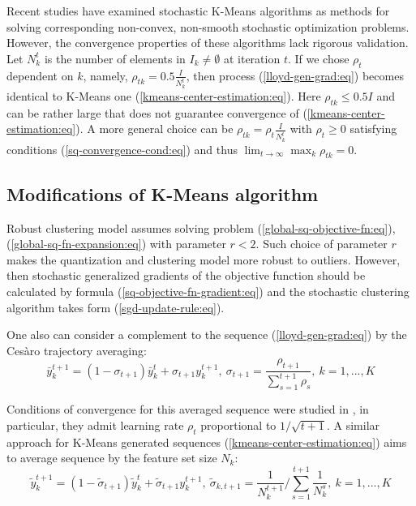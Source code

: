 Recent studies \cite{Tang_2017,Zhao_Lan_Chen_Ngo_2021} have examined stochastic K-Means algorithms as methods for solving corresponding non-convex, non-smooth stochastic optimization problems. However, the convergence properties of these algorithms lack rigorous validation. Let $ N_k^t $ is the number of elements in $ I_k \neq \emptyset $ at iteration $ t $. If we chose $ \rho_t $ dependent on $ k $, namely, $ \rho_{tk} = 0.5 \frac{I}{N_k^t} $, then process (\ref{lloyd-gen-grad:eq}) becomes identical to K-Means one (\ref{kmeans-center-estimation:eq}). Here $ \rho_{tk} \leq 0.5 I $ and can be rather large that does not guarantee convergence of (\ref{kmeans-center-estimation:eq}). A more general choice can be $ \rho_{tk} = \rho_t \frac{I}{N_k^t} $ with $ \rho_t \geq 0 $ satisfying conditions  
(\ref{sq-convergence-cond:eq}) and thus $ \lim_{t \to \infty} \max_k \rho_{tk} = 0 $.

\subsection{Modifications of K-Means algorithm}

Robust clustering model assumes solving problem (\ref{global-sq-objective-fn:eq}), (\ref{global-sq-fn-expansion:eq}) with parameter $r<2$. Such choice of parameter $r$ makes the quantization and clustering model more robust to outliers. However, then stochastic generalized gradients of the objective function should be calculated by formula (\ref{sq-objective-fn-gradient:eq}) and the stochastic clustering algorithm takes form (\ref{sgd-update-rule:eq}).

One also can consider a complement to the sequence (\ref{lloyd-gen-grad:eq}) by the Ces\`aro trajectory averaging:
\begin{equation}
    \label{kmeans-trajectory-avg:eq}
        \bar{y}_k^{t+1} = (1 - \sigma_{t+1}) \bar{y}_k^{t} + \sigma_{t+1} y_k^{t+1}, \> \sigma_{t+1} = \frac{\rho_{t+1}}{\sum_{s=1}^{t+1} \rho_{s}}, \> k = 1, ..., K
\end{equation}

Conditions of convergence for this averaged sequence were studied in \cite{mikhalevich2024}, in particular, they admit learning rate $ \rho_t $ proportional to $ 1 / \sqrt{t+1} $. A similar approach for K-Means generated sequences (\ref{kmeans-center-estimation:eq}) aims to average sequence by the feature set size $ N_k $:
\begin{equation}
    \label{kmeans-trajectory-avg-alt:eq}
        \tilde{y}_k^{t+1} = (1 - \tilde{\sigma}_{t+1}) \tilde{y}_k^{t} + \tilde{\sigma}_{t+1} y_k^{t+1}, \> \tilde{\sigma}_{k, t+1} = \frac{1}{N_k^{t+1}} / \sum_{s=1}^{t+1} \frac{1}{N_k^s}, \> k = 1, ..., K
\end{equation}

